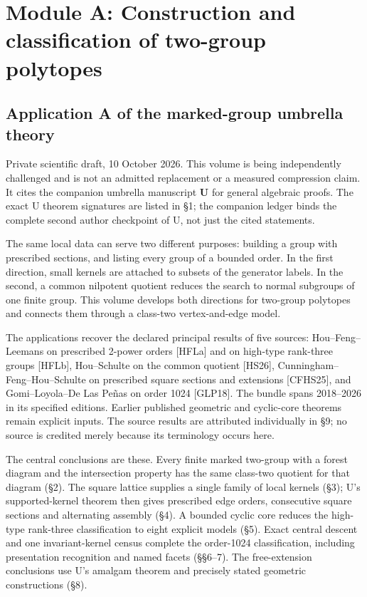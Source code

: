 \documentclass[
  11pt,
  a4paper,
]{article}
\author{}
\date{}
\begin{document}
\section{Module A: Construction and classification of two-group
polytopes}\label{module-a-construction-and-classification-of-two-group-polytopes}

\subsection{Application A of the marked-group umbrella
theory}\label{application-a-of-the-marked-group-umbrella-theory}

Private scientific draft, 10 October 2026. This volume is being
independently challenged and is not an admitted replacement or a
measured compression claim. It cites the companion umbrella manuscript
\textbf{U} for general algebraic proofs. The exact U theorem signatures
are listed in §1; the companion ledger binds the complete second author
checkpoint of U, not just the cited statements.

The same local data can serve two different purposes: building a group
with prescribed sections, and listing every group of a bounded order. In
the first direction, small kernels are attached to subsets of the
generator labels. In the second, a common nilpotent quotient reduces the
search to normal subgroups of one finite group. This volume develops
both directions for two-group polytopes and connects them through a
class-two vertex-and-edge model.

The applications recover the declared principal results of five sources:
Hou--Feng--Leemans on prescribed 2-power orders {[}HFLa{]} and on
high-type rank-three groups {[}HFLb{]}, Hou--Schulte on the common
quotient {[}HS26{]}, Cunningham--Feng--Hou--Schulte on prescribed square
sections and extensions {[}CFHS25{]}, and Gomi--Loyola--De Las Peñas on
order 1024 {[}GLP18{]}. The bundle spans 2018--2026 in its specified
editions. Earlier published geometric and cyclic-core theorems remain
explicit inputs. The source results are attributed individually in §9;
no source is credited merely because its terminology occurs here.

The central conclusions are these. Every finite marked two-group with a
forest diagram and the intersection property has the same class-two
quotient for that diagram (§2). The square lattice supplies a single
family of local kernels (§3); U's supported-kernel theorem then gives
prescribed edge orders, consecutive square sections and alternating
assembly (§4). A bounded cyclic core reduces the high-type rank-three
classification to eight explicit models (§5). Exact central descent and
one invariant-kernel census complete the order-1024 classification,
including presentation recognition and named facets (§§6--7). The
free-extension conclusions use U's amalgam theorem and precisely stated
geometric constructions (§8).
\end{document}
